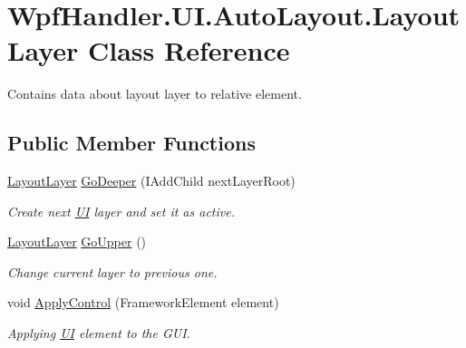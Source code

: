 \hypertarget{class_wpf_handler_1_1_u_i_1_1_auto_layout_1_1_layout_layer}{}\section{Wpf\+Handler.\+U\+I.\+Auto\+Layout.\+Layout\+Layer Class Reference}
\label{class_wpf_handler_1_1_u_i_1_1_auto_layout_1_1_layout_layer}


Contains data about layout layer to relative element.  


\subsection*{Public Member Functions}
\begin{DoxyCompactItemize}
\item 
\mbox{\hyperlink{class_wpf_handler_1_1_u_i_1_1_auto_layout_1_1_layout_layer}{Layout\+Layer}} \mbox{\hyperlink{class_wpf_handler_1_1_u_i_1_1_auto_layout_1_1_layout_layer_aaca617fe1447981b657c49376b31ab81}{Go\+Deeper}} (I\+Add\+Child next\+Layer\+Root)
\begin{DoxyCompactList}\small\item\em Create next \mbox{\hyperlink{namespace_wpf_handler_1_1_u_i}{UI}} layer and set it as active. \end{DoxyCompactList}\item 
\mbox{\hyperlink{class_wpf_handler_1_1_u_i_1_1_auto_layout_1_1_layout_layer}{Layout\+Layer}} \mbox{\hyperlink{class_wpf_handler_1_1_u_i_1_1_auto_layout_1_1_layout_layer_a537da237144a99cdb6434db5363c668f}{Go\+Upper}} ()
\begin{DoxyCompactList}\small\item\em Change current layer to previous one. \end{DoxyCompactList}\item 
void \mbox{\hyperlink{class_wpf_handler_1_1_u_i_1_1_auto_layout_1_1_layout_layer_a0f17411e0b1732930511f9db6b07cf29}{Apply\+Control}} (Framework\+Element element)
\begin{DoxyCompactList}\small\item\em Applying \mbox{\hyperlink{namespace_wpf_handler_1_1_u_i}{UI}} element to the G\+UI. \end{DoxyCompactList}\end{DoxyCompactItemize}
